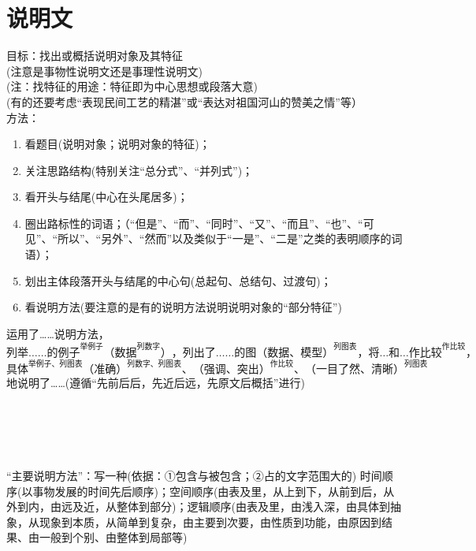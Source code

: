 \section{说明文}
目标：找出或概括说明对象及其特征\\
(注意是事物性说明文还是事理性说明文)\\
(注：找特征的用途：特征即为中心思想或段落大意)\\
(有的还要考虑``表现民间工艺的精湛''或``表达对祖国河山的赞美之情''等）\\
方法：\begin{enumerate}\item 看题目(说明对象；说明对象的特征)；
        \item 关注思路结构(特别关注``总分式''、``并列式'')；
        \item 看开头与结尾(中心在头尾居多)；
        \item 圈出路标性的词语；（``但是''、``而''、``同时''、``又''、``而且''、``也''、``可见''、``所以''、``另外''、``然而''以及类似于``一是''、``二是''之类的表明顺序的词语）；
        \item 划出主体段落开头与结尾的中心句(总起句、总结句、过渡句)；
        \item 看说明方法(要注意的是有的说明方法说明说明对象的``部分特征'')\end{enumerate}
运用了\ldots{}\ldots{}说明方法，\\
\[列举\ldots{}\ldots{}的例子^{举例子}（数据^{列数字}），列出了\ldots{}\ldots{}的图（数据、模型）^{列图表}，将\ldots{}和\ldots{}作比较^{作比较}，\]
\[具体^{举例子、列图表}（准确）^{列数字、列图表}、（强调、突出）^{作比较}、（一目了然、清晰）^{列图表}\]
地说明了\ldots{}\ldots{}(遵循``先前后后，先近后远，先原文后概括''进行)\\
\\
\\
\\
\\
\\
``主要说明方法''：写一种(依据：①包含与被包含；②占的文字范围大的)
时间顺序(以事物发展的时间先后顺序)；空间顺序(由表及里，从上到下，从前到后，从外到内，由远及近，从整体到部分)；逻辑顺序(由表及里，由浅入深，由具体到抽象，从现象到本质，从简单到复杂，由主要到次要，由性质到功能，由原因到结果、由一般到个别、由整体到局部等)
